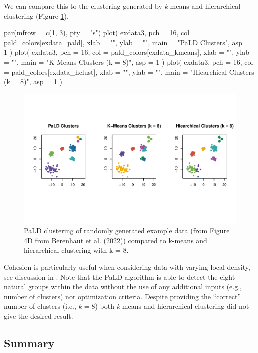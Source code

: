 We can compare this to the clustering generated by \emph{k}-means and
hierarchical clustering (Figure \ref{fig:fig5}).

\begin{Schunk}
\begin{Sinput}
par(mfrow = c(1, 3), pty = "s")
plot(
  exdata3,
  pch = 16,
  col = pald_colors[exdata_pald],
  xlab = "",
  ylab = "",
  main = "PaLD Clusters",
  asp = 1
)
plot(
  exdata3,
  pch = 16,
  col = pald_colors[exdata_kmeans],
  xlab = "",
  ylab = "",
  main = "K-Means Clusters (k = 8)",
  asp = 1
)
plot(
  exdata3,
  pch = 16,
  col = pald_colors[exdata_hclust],
  xlab = "",
  ylab = "",
  main = "Hiearchical Clusters (k = 8)",
  asp = 1
)
\end{Sinput}
\begin{figure}
\includegraphics{manuscript_files/figure-latex/fig5-1} \caption[PaLD clustering of randomly generated example data (from Figure 4D from Berenhaut et al]{PaLD clustering of randomly generated example data (from Figure 4D from Berenhaut et al. (2022)) compared to k-means and hierarchical clustering with k = 8.}\label{fig:fig5}
\end{figure}
\end{Schunk}

Cohesion is particularly useful when considering data with varying local
density, see discussion in \citep{berenhaut2022social}. Note that the
PaLD algorithm is able to detect the eight natural groups within the
data without the use of any additional inputs (e.g., number of clusters)
nor optimization criteria. Despite providing the ``correct'' number of
clusters (i.e., \(k = 8\)) both \emph{k}-means and hierarchical
clustering did not give the desired result.

\hypertarget{summary}{%
\subsection{Summary}\label{summary}}

